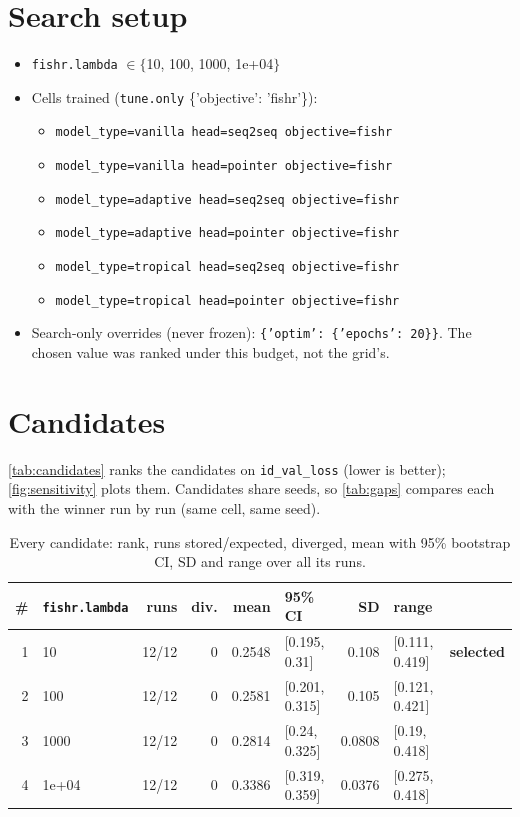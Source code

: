 \documentclass[10pt]{article}
\begin{document}
\section{Search setup}
\begin{itemize}\setlength\itemsep{0pt}
\item \texttt{fishr.lambda} $\in \{$10, 100, 1000, 1e+04$\}$
\item Cells trained (\texttt{tune.only} \{'objective': 'fishr'\}):
\begin{itemize}\setlength\itemsep{0pt}
\item \texttt{model\_type=vanilla head=seq2seq objective=fishr}
\item \texttt{model\_type=vanilla head=pointer objective=fishr}
\item \texttt{model\_type=adaptive head=seq2seq objective=fishr}
\item \texttt{model\_type=adaptive head=pointer objective=fishr}
\item \texttt{model\_type=tropical head=seq2seq objective=fishr}
\item \texttt{model\_type=tropical head=pointer objective=fishr}
\end{itemize}
\item Search-only overrides (never frozen): \texttt{\{'optim': \{'epochs': 20\}\}}. The chosen value was ranked under this budget, not the grid's.
\end{itemize}

\section{Candidates}
\autoref{tab:candidates} ranks the candidates on \texttt{id\_val\_loss} (lower is better); \autoref{fig:sensitivity} plots them.
Candidates share seeds, so \autoref{tab:gaps} compares each with the winner run by run (same cell, same seed).

{\small
\begin{longtable}{rlrrrlrll}
\caption{Every candidate: rank, runs stored/expected, diverged, mean with 95\% bootstrap CI, SD and range over all its runs.}\label{tab:candidates}\\
\toprule
\# & \texttt{fishr.lambda} & runs & div. & mean & 95\% CI & SD & range & \\
\midrule
\endhead
1 & 10 & 12/12 & 0 & 0.2548 & [0.195, 0.31] & 0.108 & [0.111, 0.419] & \textbf{selected}\\
2 & 100 & 12/12 & 0 & 0.2581 & [0.201, 0.315] & 0.105 & [0.121, 0.421] & \\
3 & 1000 & 12/12 & 0 & 0.2814 & [0.24, 0.325] & 0.0808 & [0.19, 0.418] & \\
4 & 1e+04 & 12/12 & 0 & 0.3386 & [0.319, 0.359] & 0.0376 & [0.275, 0.418] & \\
\bottomrule
\end{longtable}
}
\end{document}
